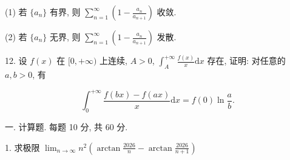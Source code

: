 \documentclass{examcollection}
\renewcommand{\displayformula}[1]{\[#1\]}
\begin{document}
{\begin{minipage}{\textwidth}
(1) 若 $\{a_{n}\}$ 有界, 则 $\sum_{n=1}^{\infty}\left(1 - \frac{a_n}{a_{n+1}}\right)$ 收敛.\par
(2) 若 $\{a_{n}\}$ 无界, 则 $\sum_{n=1}^{\infty}\left(1 - \frac{a_n}{a_{n+1}}\right)$ 发散.\par
12. 设 $f(x)$ 在 $[0, +\infty)$ 上连续, $A > 0$, $\int_{A}^{+\infty} \frac{f(x)}{x} \mathrm{d}x$ 存在, 证明: 对任意的 $a, b > 0$, 有\par
\displayformula{\int_ {0} ^ {+ \infty} \frac {f (b x) - f (a x)}{x} \mathrm{d} x = f (0) \ln \frac {a}{b}.}\par
{}\smallskip
一. 计算题. 每题 10 分, 共 60 分.\par
1. 求极限 $\lim_{n\to \infty}n^2\left(\arctan{\frac{2026}{n}} -\arctan{\frac{2026}{n + 1}}\right)$\par
\end{minipage}}
\ifdim\dimexpr\ht\proofbox+\dp\proofbox\relax>\textheight
\noindent\resizebox{!}{\textheight}{\usebox{\proofbox}}\else\noindent\usebox{\proofbox}\fi\clearpage
\end{document}

